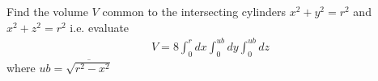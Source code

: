 \example{}

Find the volume $V$ common to the intersecting cylinders $x^2 + y^2
= r^2$ and $x^2 + z^2 = r^2$ i.e. evaluate
\begin{eqnarray*}
V = 8 \int^r_0 dx \int^{ub}_0 dy \int^{ub}_0 dz
\end{eqnarray*}
where $ub = \overline{\sqrt { r^2 - x^2}}$



